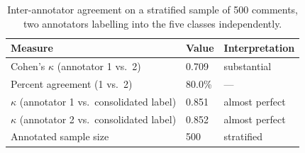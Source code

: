 \begin{table}[!htbp]
\centering
\caption{Inter-annotator agreement on a stratified sample of 500 comments, two annotators labelling into the five classes independently.}
\label{tab:iaa}
\small
\begin{tabular}{@{}lll@{}}
\toprule
\textbf{Measure} & \textbf{Value} & \textbf{Interpretation} \\
\midrule
Cohen's $\kappa$ (annotator 1 vs.\ 2) & 0.709 & substantial \\
Percent agreement (1 vs.\ 2) & 80.0\% & — \\
$\kappa$ (annotator 1 vs.\ consolidated label) & 0.851 & almost perfect \\
$\kappa$ (annotator 2 vs.\ consolidated label) & 0.852 & almost perfect \\
Annotated sample size & 500 & stratified \\
\bottomrule
\end{tabular}
\end{table}